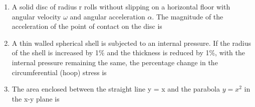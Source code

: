 \documentclass[journal,12pt,onecolumn]{IEEEtran}
\begin{document}
\begin{enumerate}
    \item A solid disc of radius r rolls without slipping on a horizontal floor with angular velocity \(\omega\) and angular acceleration \(\alpha\). The magnitude of the acceleration of the point of contact on the disc is

          \begin{enumerate}
          \end{enumerate}

    \item A thin walled spherical shell is subjected to an internal pressure. If the radius of the shell is increased by 1\% and the thickness is reduced by 1\%, with the internal pressure remaining the same, the percentage change in the circumferential (hoop) stress is

          \begin{enumerate}
          \end{enumerate}

    \item The area enclosed between the straight line y = x and the parabola \(y = x^2\) in the x-y plane is

          \begin{enumerate}
          \end{enumerate}


\end{enumerate}
\end{document}
